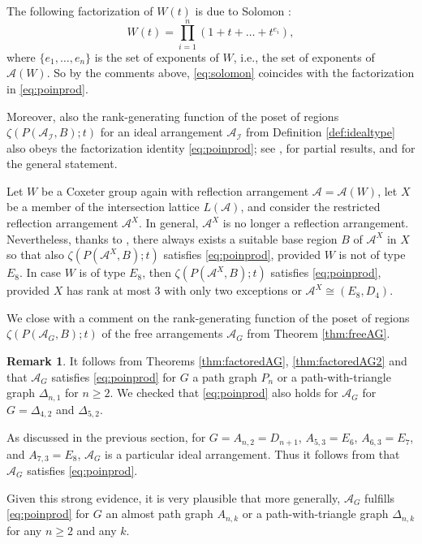 \documentclass[12pt]{amsart}
\newcommand\CA{{\mathscr A}}
\newcommand\CI{{\mathcal I}}
\numberwithin{equation}{section}
\theoremstyle{plain}
\theoremstyle{definition}
\newtheorem{remark}[equation]{Remark}
\begin{document}
The following factorization of 
$W(t)$ is due to Solomon \cite{solomon:chevalley}:
\begin{equation}
	\label{eq:solomon}
	W(t) = \prod_{i=1}^n(1 + t + \ldots + t^{e_i}),
\end{equation}
where $\{e_1, \ldots, e_n\}$ is the 
set of exponents of $W$, i.e., the set of exponents of $\CA(W)$. So by the comments above, \eqref{eq:solomon} coincides with the factorization in \eqref{eq:poinprod}.


Moreover, also the rank-generating function of the poset of regions $\zeta(P(\CA_\CI,B); t)$ for 
an ideal arrangement $\CA_\CI$ 
from Definition \ref{def:idealtype} 
also obeys the factorization identity \eqref{eq:poinprod}; see 
\cite{sommerstymoczko}, 
\cite{roehrle:ideal} for partial results, and 
\cite[Cor.~1.3]{abeetal:hess} for the general statement.

Let $W$ be a Coxeter group again with reflection arrangement $\CA = \CA(W)$, 
let $X$ be a member of the intersection lattice $L(\CA)$, and consider the restricted reflection arrangement $\CA^X$. In general, $\CA^X$ is no longer a reflection arrangement. 
Nevertheless, thanks to  \cite[Thm.~1.3]{moellerroehrle:nice},
there always exists a suitable base region $B$ of $\CA^X$ in $X$ so that also 
$\zeta(P(\CA^X,B); t)$ satisfies \eqref{eq:poinprod}, provided $W$ is not of type $E_8$. In case $W$ is of type $E_8$, then $\zeta(P(\CA^X,B); t)$ satisfies \eqref{eq:poinprod}, provided $X$ has rank at most $3$ with only two exceptions or $\CA^X \cong (E_8,D_4)$.



We close with a comment on the
rank-generating function of the poset of regions $\zeta(P(\CA_G,B); t)$ 
of the free  arrangements $\CA_G$ from Theorem \ref{thm:freeAG}.

\begin{remark}
	\label{rem:Hnzeta}
	It follows from Theorems \ref{thm:factoredAG}, \ref{thm:factoredAG2} and \cite[Prop.~3.4, Thm.~6.1]{jambuparis:factored} that 
	$\CA_G$ satisfies \eqref{eq:poinprod} for 
	$G$ a path graph $P_n$ or a path-with-triangle graph $\Delta_{n,1}$ for $n \ge 2$.
		We checked that \eqref{eq:poinprod} also holds for $\CA_G$ for 
	$G = \Delta_{4,2}$ and $\Delta_{5,2}$.
	
	As discussed in the previous section, for $G = A_{n,2} =D_{n+1}$, $A_{5,3} =E_6$, $A_{6,3} =E_7$, and $A_{7,3} =E_8$,  $\CA_G$ is a particular ideal arrangement. Thus it follows from  \cite[Cor.~1.3]{abeetal:hess} that 
		$\CA_G$ satisfies \eqref{eq:poinprod}.
		
	Given this strong evidence, it is very plausible that more generally, $\CA_G$ fulfills \eqref{eq:poinprod} for 
	$G$ an  almost path graph $A_{n,k}$ or a path-with-triangle graph $\Delta_{n,k}$ for any $n \ge 2$ and any $k$.
\end{remark}
 
\end{document}
